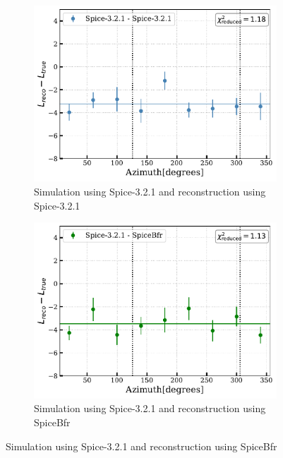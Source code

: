 \begin{figure}[hbt!]

\begin{subfigure}{.7\textwidth}
    \includegraphics[width=\linewidth]{./figures/EventSample/Lbias_spicespice.pdf}
    \caption{Simulation using Spice-3.2.1 and reconstruction using Spice-3.2.1}
\end{subfigure}\hfill %
\begin{subfigure}{.7\textwidth}
    \includegraphics[width=\linewidth]{./figures/EventSample/Lbias_spicebfr.pdf}
    \caption{Simulation using Spice-3.2.1 and reconstruction using SpiceBfr}
\end{subfigure}


\end{figure}
